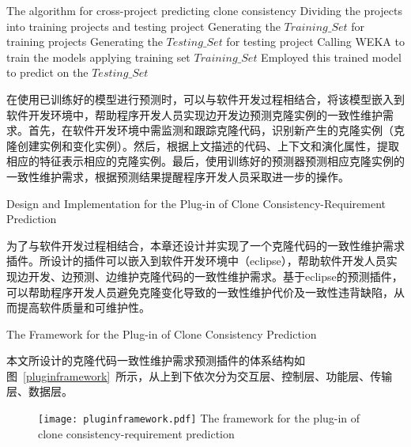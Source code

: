 \vspace{1em}
\begin{minipage}{0.8\textwidth}
\centering
\begin{algorithm}[H]
 {The algorithm for cross-project predicting clone consistency}
\label{alg-crossperdiction}
Dividing the projects into training projects and testing project\;
Generating the $Training\_{Set}$ for training projects\;
Generating the $Testing\_{Set}$ for testing project\;
Calling WEKA to train the models applying training set $Training\_{Set}$\;
Employed this trained model to predict on the $Testing\_{Set}$\;
\end{algorithm}
\end{minipage}
\vspace{1em}

在使用已训练好的模型进行预测时，可以与软件开发过程相结合，将该模型嵌入到软件开发环境中，帮助程序开发人员实现边开发边预测克隆实例的一致性维护需求。首先，在软件开发环境中需监测和跟踪克隆代码，识别新产生的克隆实例（克隆创建实例和变化实例）。然后，根据上文描述的代码、上下文和演化属性，提取相应的特征表示相应的克隆实例。最后，使用训练好的预测器预测相应克隆实例的一致性维护需求，根据预测结果提醒程序开发人员采取进一步的操作。

{Design and Implementation for the Plug-in of Clone Consistency-Requirement Prediction}

为了与软件开发过程相结合，本章还设计并实现了一个克隆代码的一致性维护需求插件。所设计的插件可以嵌入到软件开发环境中（eclipse），帮助软件开发人员实现边开发、边预测、边维护克隆代码的一致性维护需求。基于eclipse的预测插件，可以帮助程序开发人员避免克隆变化导致的一致性维护代价及一致性违背缺陷，从而提高软件质量和可维护性。

{The Framework for the Plug-in of Clone Consistency Prediction}

本文所设计的克隆代码一致性维护需求预测插件的体系结构如图~\ref{pluginframework}~所示，从上到下依次分为交互层、控制层、功能层、传输层、数据层。

\begin{figure}[h]
\centering
\texttt{[image: pluginframework.pdf]}
{The framework for the plug-in of clone consistency-requirement prediction}
\vspace{-1em}
\end{figure}

